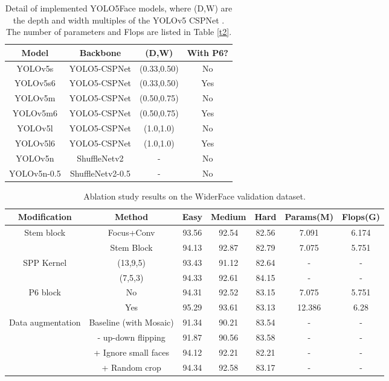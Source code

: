 \documentclass[conference]{IEEEtran}
\begin{document}
\begin{table}[htb]
    \centering
    \begin{tabular}{c|c|c|c}
        \hline
        Model &  Backbone & (D,W) & With P6? \\
        \hline
        YOLOv5s	& YOLO5-CSPNet \cite{YOLOv5} & (0.33,0.50) & No \\
        YOLOv5s6	& YOLO5-CSPNet & (0.33,0.50) & Yes \\ 
        YOLOv5m	& YOLO5-CSPNet & (0.50,0.75) & No \\
        YOLOv5m6	& YOLO5-CSPNet & (0.50,0.75) & Yes \\
        YOLOv5l	& YOLO5-CSPNet & (1.0,1.0) & No \\
        YOLOv5l6	& YOLO5-CSPNet & (1.0,1.0) & Yes \\
        \hline
        YOLOv5n	& ShuffleNetv2 \cite{ShuffleNetv2} & - & No \\
        YOLOv5n-0.5	& ShuffleNetv2-0.5 \cite{ShuffleNetv2} & - & No \\ 	

        \hline
    \end{tabular}
    \caption{Detail of implemented YOLO5Face models, where (D,W) are the depth and width multiples of the YOLOv5 CSPNet \cite{YOLOv5}. The number of parameters and Flops are listed in Table \ref{t2}.}
    \label{t0}
\end{table}

\begin{table*}[!htb]
    \centering
    \begin{tabular}{c|c|c|c|c|c|c}
        \hline
        Modification & Method & Easy & Medium &  Hard & Params(M) & Flops(G)  \\
        \hline

        \multirow{2}{*}{Stem block} & Focus+Conv & 93.56 & 92.54 & 82.56 & 7.091 & 6.174 \\ \cline{2-7}
        &  Stem Block & 94.13 & 92.87 & 82.79 & 7.075 &5.751 \\
        \hline
        \multirow{2}{*}{SPP Kernel} & (13,9,5) & 93.43 & 91.12 & 82.64 & - & - \\ \cline{2-7}
        & (7,5,3) & 94.33 & 92.61 & 84.15 & - & - \\
        \hline
        \multirow{2}{*}{P6 block} & No & 94.31  & 92.52 & 83.15 & 7.075 &5.751 \\ \cline{2-7}
         & Yes & 95.29 & 93.61 & 83.13 & 12.386 & 6.28 \\
        \hline
        \multirow{4}{*}{Data augmentation}  & Baseline (with Mosaic) & 91.34  & 90.21 & 83.54 & - & - \\ \cline{2-7}
         & - up-down flipping & 91.87 & 90.56 & 83.58 & - & - \\ \cline{2-7}
         & + Ignore small faces & 94.12 & 92.21 & 82.21 & - & - \\ \cline{2-7}
         & + Random crop & 94.34 & 92.58 & 83.17 & - & - \\ \cline{2-7}
        \hline
    \end{tabular}
    \caption{Ablation study results on the WiderFace validation dataset.}
    \label{t1}
\end{table*}
\end{document}
